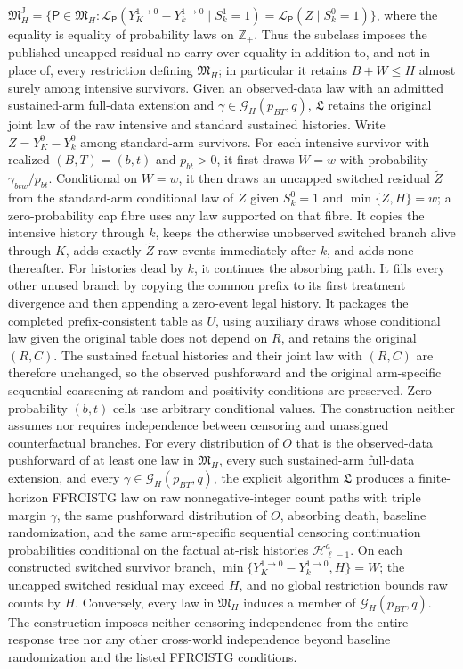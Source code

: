 \(\mathfrak M_H^{\mathrm J}=\{\mathsf P\in\mathfrak M_H:\mathcal L_{\mathsf P}(Y_K^{1\to0}-Y_k^{1\to0}\mid S_k^1=1)=\mathcal L_{\mathsf P}(Z\mid S_k^0=1)\}\), where the equality is equality of probability laws on \(\mathbb Z_+\). Thus the subclass imposes the published uncapped residual no-carry-over equality in addition to, and not in place of, every restriction defining \(\mathfrak M_H\); in particular it retains \(B+W\le H\) almost surely among intensive survivors.
Given an observed-data law with an admitted sustained-arm full-data extension and \(\gamma\in\mathcal G_H(p_{BT},q)\), \(\mathfrak L\) retains the original joint law of the raw intensive and standard sustained histories. Write \(Z=Y_K^0-Y_k^0\) among standard-arm survivors. For each intensive survivor with realized \((B,T)=(b,t)\) and \(p_{bt}>0\), it first draws \(W=w\) with probability \(\gamma_{btw}/p_{bt}\). Conditional on \(W=w\), it then draws an uncapped switched residual \(\widetilde Z\) from the standard-arm conditional law of \(Z\) given \(S_k^0=1\) and \(\min\{Z,H\}=w\); a zero-probability cap fibre uses any law supported on that fibre. It copies the intensive history through \(k\), keeps the otherwise unobserved switched branch alive through \(K\), adds exactly \(\widetilde Z\) raw events immediately after \(k\), and adds none thereafter. For histories dead by \(k\), it continues the absorbing path. It fills every other unused branch by copying the common prefix to its first treatment divergence and then appending a zero-event legal history. It packages the completed prefix-consistent table as \(U\), using auxiliary draws whose conditional law given the original table does not depend on \(R\), and retains the original \((R,C)\). The sustained factual histories and their joint law with \((R,C)\) are therefore unchanged, so the observed pushforward and the original arm-specific sequential coarsening-at-random and positivity conditions are preserved. Zero-probability \((b,t)\) cells use arbitrary conditional values. The construction neither assumes nor requires independence between censoring and unassigned counterfactual branches.
For every distribution of \(O\) that is the observed-data pushforward of at least one law in \(\mathfrak M_H\), every such sustained-arm full-data extension, and every \(\gamma\in\mathcal G_H(p_{BT},q)\), the explicit algorithm \(\mathfrak L\) produces a finite-horizon FFRCISTG law on raw nonnegative-integer count paths with triple margin \(\gamma\), the same pushforward distribution of \(O\), absorbing death, baseline randomization, and the same arm-specific sequential censoring continuation probabilities conditional on the factual at-risk histories \(\mathcal H_{\ell-1}^a\). On each constructed switched survivor branch, \(\min\{Y_K^{1\to0}-Y_k^{1\to0},H\}=W\); the uncapped switched residual may exceed \(H\), and no global restriction bounds raw counts by \(H\). Conversely, every law in \(\mathfrak M_H\) induces a member of \(\mathcal G_H(p_{BT},q)\). The construction imposes neither censoring independence from the entire response tree nor any other cross-world independence beyond baseline randomization and the listed FFRCISTG conditions.
